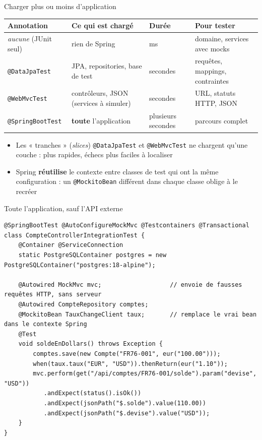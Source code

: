 \documentclass[aspectratio=169,10pt]{beamer}
\begin{document}
\begin{frame}{Charger plus ou moins d'application}
  \footnotesize
  \begin{datacard}
    \begin{tabular}{@{}p{3.0cm}p{4.6cm}p{1.8cm}p{2.6cm}@{}}
      \toprule
      \textbf{Annotation} & \textbf{Ce qui est chargé} & \textbf{Durée} & \textbf{Pour tester} \\
      \midrule
      \textit{aucune} (JUnit seul) & rien de Spring & ms & domaine, services avec mocks \\[0.5mm]
      \texttt{@DataJpaTest} & JPA, repositories, base de test & secondes & requêtes, mappings, contraintes \\[0.5mm]
      \texttt{@WebMvcTest} & contrôleurs, JSON (services à simuler) & secondes & URL, statuts HTTP, JSON \\[0.5mm]
      \texttt{@SpringBootTest} & \textbf{toute} l'application & plusieurs secondes & parcours complet \\
      \bottomrule
    \end{tabular}
  \end{datacard}
  \vspace{1mm}
  \begin{itemize}\small
    \item Les « tranches » (\textit{slices}) \texttt{@DataJpaTest} et \texttt{@WebMvcTest} ne chargent qu'une couche : plus rapides, échecs plus faciles à localiser
    \item Spring \textbf{réutilise} le contexte entre classes de test qui ont la même configuration : un \texttt{@MockitoBean} différent dans chaque classe oblige à le recréer
  \end{itemize}
\end{frame}

\begin{frame}[fragile]{Toute l'application, sauf l'API externe}
\begin{lstlisting}[basicstyle=\lstcode\scriptsize]
@SpringBootTest @AutoConfigureMockMvc @Testcontainers @Transactional
class CompteControllerIntegrationTest {
    @Container @ServiceConnection
    static PostgreSQLContainer postgres = new PostgreSQLContainer("postgres:18-alpine");

    @Autowired MockMvc mvc;                   // envoie de fausses requêtes HTTP, sans serveur
    @Autowired CompteRepository comptes;
    @MockitoBean TauxChangeClient taux;       // remplace le vrai bean dans le contexte Spring
    @Test
    void soldeEnDollars() throws Exception {
        comptes.save(new Compte("FR76-001", eur("100.00")));
        when(taux.taux("EUR", "USD")).thenReturn(eur("1.10"));
        mvc.perform(get("/api/comptes/FR76-001/solde").param("devise", "USD"))
           .andExpect(status().isOk())
           .andExpect(jsonPath("$.solde").value(110.00))
           .andExpect(jsonPath("$.devise").value("USD"));
    }
}
\end{lstlisting}
\end{frame}
\end{document}
